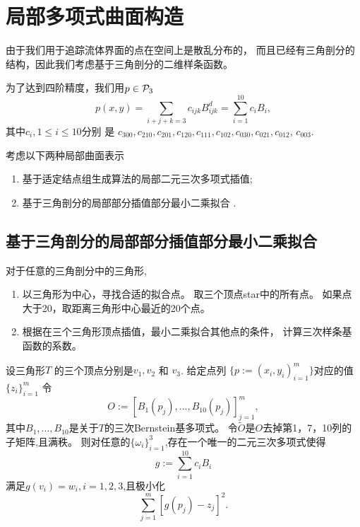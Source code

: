 \section{局部多项式曲面构造}
\label{sec:localSurface}
\begin{rem}
  由于我们用于追踪流体界面的点在空间上是散乱分布的，
  而且已经有三角剖分的结构，因此我们考虑基于三角剖分的二维样条函数。
\end{rem}

\begin{rem}
  为了达到四阶精度，我们用$p\in {\cal P}_3$
  \begin{displaymath}
    p(x,y)=\sum_{i+j+k=3}c_{ijk}B_{ijk}^d=\sum_{i=1}^{10}c_iB_i,
  \end{displaymath}
  其中$c_i,1\leq i\leq 10$分别
  是
  $c_{300},c_{210},c_{201},c_{120},c_{111},c_{102},c_{030},c_{021},c_{012}$,
  $c_{003}$.
\end{rem}



\begin{rem}
  考虑以下两种局部曲面表示
  \begin{enumerate}
  \item 基于适定结点组生成算法的局部二元三次多项式插值\cite{ShaoThesis};
  \item 基于三角剖分的局部部分插值部分最小二乘拟合
    \cite{schumaker2015spline}.
  \end{enumerate}
\end{rem}

\subsection{基于三角剖分的局部部分插值部分最小二乘拟合}
\label{sec:局部三次样条曲面}
\begin{defn}[算法]\cite{schumaker2015spline}
  对于任意的三角剖分中的三角形,
\begin{enumerate}
\item 以三角形为中心，寻找合适的拟合点。
  取三个顶点star中的所有点。
  如果点大于20，取距离三角形中心最近的20个点。
\item 根据在三个三角形顶点插值，最小二乘拟合其他点的条件，
  计算三次样条基函数的系数。
\end{enumerate}
\end{defn}

\begin{lem}
  设三角形$T$ 的三个顶点分别是$v_1,v_2$ 和 $v_3$.
 给定点列 $\{p:=(x_i,y_i)^m_{i=1}\}$对应的值 $\{z_i\}^m_{i=1}$
 令
  \begin{displaymath}
    O:=[B_1(p_j),...,B_{10}(p_j)]_{j=1}^m,
  \end{displaymath}
  其中$B_1,...,B_{10}$是关于$T$的三次Bernstein基多项式。
  令$\tilde{O}$是$O$去掉第1，7，10列的子矩阵,且满秩。
  则对任意的$\{\omega_i\}_{i=1}^3$,存在一个唯一的二元三次多项式使得
  \begin{displaymath}
    g:=\sum_{i=1}^{10}c_iB_i
  \end{displaymath}
  满足$g(v_i)=w_i,i=1,2,3$,且极小化
  \begin{displaymath}
    \sum_{j=1}^m[g(p_j)-z_j]^2.
  \end{displaymath}
\end{lem}

